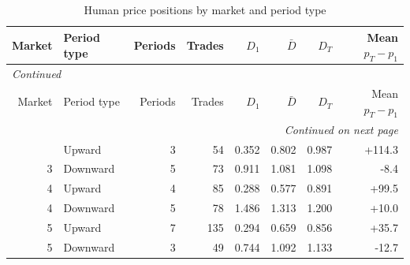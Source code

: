 \scriptsize
\begin{longtable}{rlrrrrrr}
\caption{Human price positions by market and period type}\label{tab:app-human-market}\\
\toprule
Market & Period type & Periods & Trades & $D_1$ & $\bar D$ & $D_T$ & Mean $p_T-p_1$ \\
\midrule
\endfirsthead
\multicolumn{8}{l}{\textit{Continued}}\\
\toprule
Market & Period type & Periods & Trades & $D_1$ & $\bar D$ & $D_T$ & Mean $p_T-p_1$ \\
\midrule
\endhead
\midrule
\multicolumn{8}{r}{\textit{Continued on next page}}\\
\endfoot
\bottomrule
\endlastfoot
3 & Upward & 3 & 54 & 0.352 & 0.802 & 0.987 & +114.3 \\
3 & Downward & 5 & 73 & 0.911 & 1.081 & 1.098 & -8.4 \\
4 & Upward & 4 & 85 & 0.288 & 0.577 & 0.891 & +99.5 \\
4 & Downward & 5 & 78 & 1.486 & 1.313 & 1.200 & +10.0 \\
5 & Upward & 7 & 135 & 0.294 & 0.659 & 0.856 & +35.7 \\
5 & Downward & 3 & 49 & 0.744 & 1.092 & 1.133 & -12.7 \\
\end{longtable}

